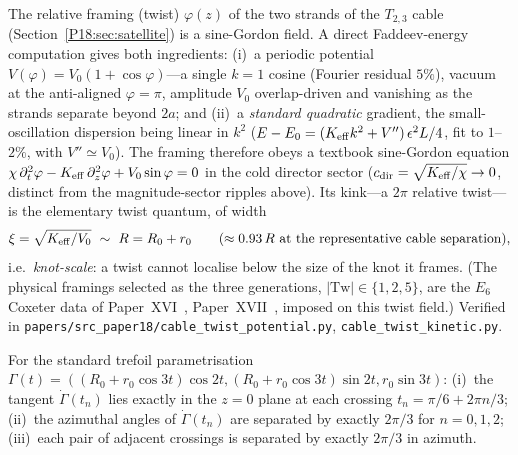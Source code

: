 \begin{proposition}
\label{P18:prop:twist_sinegordon}
The relative framing (twist) $\varphi(z)$ of the two strands of the $T_{2,3}$
cable (Section~\ref{P18:sec:satellite}) is a sine-Gordon field. A direct
Faddeev-energy computation gives both ingredients: (i)~a periodic potential
$V(\varphi)=V_0(1+\cos\varphi)$---a single $k=1$ cosine (Fourier residual
$5\%$), vacuum at the anti-aligned $\varphi=\pi$, amplitude $V_0$ overlap-driven
and vanishing as the strands separate beyond $2a$; and (ii)~a \emph{standard
quadratic} gradient, the small-oscillation dispersion being linear in $k^2$
($E-E_0=(K_{\rm eff}k^2+V'')\,\epsilon^2 L/4$, fit to $1$--$2\%$, with
$V''\simeq V_0$). The framing therefore obeys a textbook sine-Gordon equation
$\chi\,\partial_t^2\varphi-K_{\rm eff}\,\partial_z^2\varphi+V_0\sin\varphi=0$ in
the cold director sector ($c_{\rm dir}=\sqrt{K_{\rm eff}/\chi}\to0$, distinct
from the magnitude-sector ripples above). Its kink---a $2\pi$ relative twist---is
the elementary twist quantum, of width
\begin{equation}
  \xi=\sqrt{K_{\rm eff}/V_0}\ \sim\ R=R_0+r_0
  \qquad(\text{$\approx0.93\,R$ at the representative cable separation}),
  \label{P18:eq:twist_soliton}
\end{equation}
i.e.\ \emph{knot-scale}: a twist cannot localise below the size of the knot it
frames. (The physical framings selected as the three generations,
$|\mathrm{Tw}|\in\{1,2,5\}$, are the $E_6$ Coxeter data of
Paper~XVI~\cite{Paper16}, Paper~XVII~\cite{Paper17}, imposed on this twist
field.) Verified in
\texttt{papers/src\_paper18/cable\_twist\_potential.py},
\texttt{cable\_twist\_kinetic.py}.
\end{proposition}

\begin{theorem}
\label{P18:thm:crossing_geometry}
For the standard trefoil parametrisation
$\Gamma(t)=((R_0+r_0\cos3t)\cos2t,(R_0+r_0\cos3t)\sin2t,r_0\sin3t)$:
(i)~the tangent $\dot\Gamma(t_n)$ lies exactly in the $z=0$ plane at
each crossing $t_n=\pi/6+2\pi n/3$; (ii)~the azimuthal angles of
$\dot\Gamma(t_n)$ are separated by exactly $2\pi/3$ for $n=0,1,2$;
(iii)~each pair of adjacent crossings is separated by exactly
$2\pi/3$ in azimuth.
\end{theorem}

